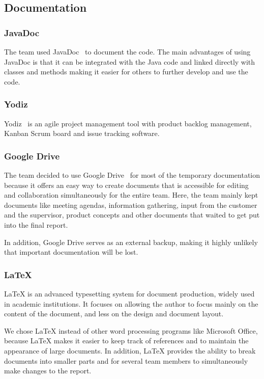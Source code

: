 \subsection{Documentation}

\subsubsection{JavaDoc}
The team used JavaDoc~\cite{javadoc} to document the code. The main advantages of using JavaDoc is that it can be integrated with the Java code and linked directly with classes and methods making it easier for others to further develop and use the code.

\subsubsection{Yodiz}
Yodiz~\cite{yodiz} is an agile project management tool with product backlog management, Kanban Scrum board and issue tracking software.

\subsubsection{Google Drive}
The team decided to use Google Drive~\cite{gdrive} for most of the temporary documentation because it offers an easy way to create documents that is accessible for editing and collaboration simultaneously for the entire team. Here, the team mainly kept documents like meeting agendas, information gathering, input from the customer and the supervisor, product concepts and other documents that waited to get put into the final report. 

In addition, Google Drive serves as an external backup, making it highly unlikely that important documentation will be lost. 


\subsubsection{\LaTeX}
LaTeX is an advanced typesetting system for document production, widely used in
academic institutions. It focuses on allowing the author to focus mainly on the content of the document, and less on the design and document layout.

We chose LaTeX instead of other word processing programs like Microsoft Office, because LaTeX makes it easier to keep track of references and to maintain the appearance of large
documents. In addition, LaTeX provides the ability to break documents into smaller parts and for several team members to simultaneously make changes to the report.

